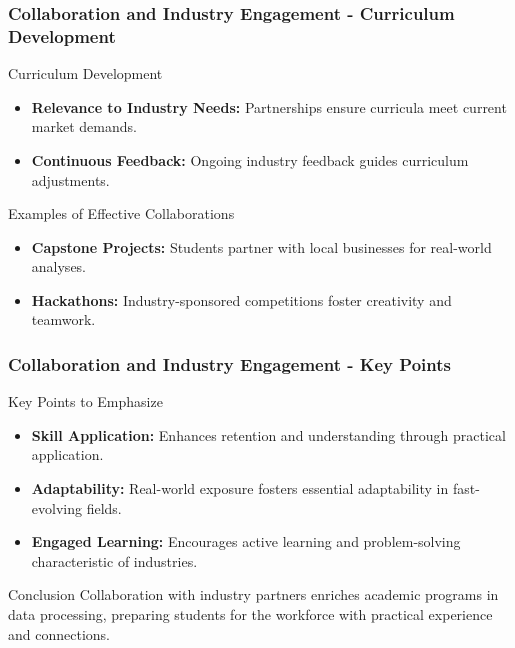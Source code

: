 \documentclass{beamer}
\begin{document}
\begin{frame}[fragile]
    \frametitle{Collaboration and Industry Engagement - Curriculum Development}
    \begin{block}{Curriculum Development}
        \begin{itemize}
            \item \textbf{Relevance to Industry Needs:} Partnerships ensure curricula meet current market demands.
            \item \textbf{Continuous Feedback:} Ongoing industry feedback guides curriculum adjustments.
        \end{itemize}
    \end{block}

    \begin{block}{Examples of Effective Collaborations}
        \begin{itemize}
            \item \textbf{Capstone Projects:} Students partner with local businesses for real-world analyses.
            \item \textbf{Hackathons:} Industry-sponsored competitions foster creativity and teamwork.
        \end{itemize}
    \end{block}
\end{frame}

\begin{frame}[fragile]
    \frametitle{Collaboration and Industry Engagement - Key Points}
    \begin{block}{Key Points to Emphasize}
        \begin{itemize}
            \item \textbf{Skill Application:} Enhances retention and understanding through practical application.
            \item \textbf{Adaptability:} Real-world exposure fosters essential adaptability in fast-evolving fields.
            \item \textbf{Engaged Learning:} Encourages active learning and problem-solving characteristic of industries.
        \end{itemize}
    \end{block}

    \begin{block}{Conclusion}
        Collaboration with industry partners enriches academic programs in data processing, preparing students for the workforce with practical experience and connections.
    \end{block}
\end{frame}
\end{document}
